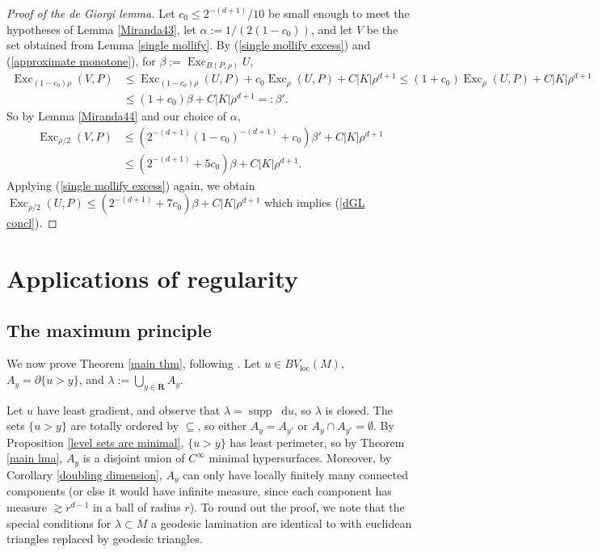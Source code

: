 \documentclass[reqno,10pt]{amsart}
\newcommand{\RR}{\mathbf{R}}
\DeclareMathOperator{\Exc}{Exc}
\DeclareMathOperator{\supp}{supp}
\newcommand*\dif{\mathop{}\!\mathrm{d}}
\newcommand{\loc}{\mathrm{loc}}
\theoremstyle{definition}
\numberwithin{equation}{section}
\begin{document}
\begin{proof}[Proof of the de Giorgi lemma]
Let $c_0 \leq 2^{-(d + 1)}/10$ be small enough to meet the hypotheses of Lemma \ref{Miranda43}, let $\alpha := 1/(2(1 - c_0))$, and let $V$ be the set obtained from Lemma \ref{single mollify}.
By (\ref{single mollify excess}) and (\ref{approximate monotone}), for $\beta := \Exc_{B(P, \rho)} U$,
\begin{align*}
\Exc_{(1 - c_0) \rho} (V, P) &\leq \Exc_{(1 - c_0) \rho} (U, P) + c_0 \Exc_\rho (U, P) + C|K| \rho^{d + 1} \leq (1 + c_0) \Exc_\rho (U, P) + C |K| \rho^{d + 1} \\
&\leq (1 + c_0) \beta + C |K| \rho^{d + 1} =: \beta'.
\end{align*}
So by Lemma \ref{Miranda44} and our choice of $\alpha$,
\begin{align*}
\Exc_{\rho/2} (V, P) &\leq (2^{-(d + 1)} (1 - c_0)^{-(d + 1)} + c_0) \beta' + C |K| \rho^{d + 1} \\
&\leq (2^{-(d + 1)} + 5c_0) \beta + C |K| \rho^{d + 1}.
\end{align*}
Applying (\ref{single mollify excess}) again, we obtain $\Exc_{\rho/2} (U, P) \leq (2^{-(d + 1)} + 7 c_0) \beta + C |K| \rho^{d +1}$ which implies (\ref{dGL concl}).
\end{proof}


\section{Applications of regularity}\label{GornySec}

\subsection{The maximum principle}\label{Max Princip}
We now prove Theorem \ref{main thm}, following \cite[\S3]{górny2017planar}. Let $u \in BV_\loc(M)$, $A_y = \partial \{u > y\}$, and $\lambda := \bigcup_{y \in \RR} A_y$.

Let $u$ have least gradient, and observe that $\lambda = \supp \dif u$, so $\lambda$ is closed.
The sets $\{u > y\}$ are totally ordered by $\subseteq$, so either $A_y = A_{y'}$ or $A_y \cap A_{y'} = \emptyset$.
By Proposition \ref{level sets are minimal}, $\{u > y\}$ has least perimeter, so by Theorem \ref{main lma}, $A_y$ is a disjoint union of $C^\infty$ minimal hypersurfaces.
Moreover, by Corollary \ref{doubling dimension}, $A_y$ can only have locally finitely many connected components (or else it would have infinite measure, since each component has measure $\gtrsim r^{d - 1}$ in a ball of radius $r$).
To round out the proof, we note that the special conditions for $\lambda \subset \overline M$ a geodesic lamination are identical to \cite[Proposition 3.5]{górny2017planar} with euclidean triangles replaced by geodesic triangles.
\end{document}
